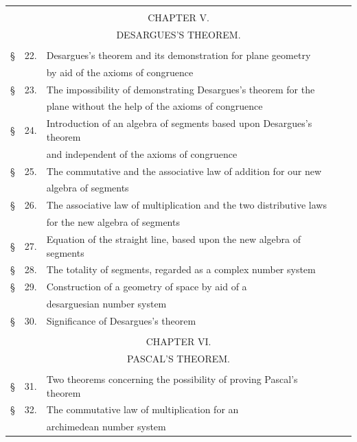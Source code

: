 \documentclass[11pt,oneside]{book}
\begin{document}
\begin{tabular}{l@{}rl@{\ }r}
\multicolumn{4}{c}{}\\
\multicolumn{4}{c}{CHAPTER V.}\\
\multicolumn{4}{c}{\small DESARGUES'S THEOREM.}\\
\multicolumn{4}{c}{}\\
\S &22. &Desargues's theorem and its demonstration for plane geometry&\\
&& by aid of the axioms of congruence~\dotfill &\pageref{p22}\\
\S &23. &The impossibility of demonstrating Desargues's theorem for the&\\
&& plane without the help of the axioms of congruence~\dotfill &\pageref{p23}\\
\S &24. &Introduction of an algebra of segments based upon Desargues's theorem&\\
&& and independent of the axioms of congruence~\dotfill &\pageref{p24}\\
\S &25. &The commutative and the associative law of addition for our new&\\
&& algebra of segments~\dotfill &\pageref{p25}\\
\S &26. &The associative law of multiplication and the two distributive laws&\\
&& for the new algebra of segments~\dotfill &\pageref{p26}\\
\S &27. &Equation of the straight line, based upon the new algebra of segments~\dotfill &\pageref{p27}\\
\S &28. &The totality of segments, regarded as a complex number system~\dotfill &\pageref{p28}\\
\S &29. &Construction of a geometry of space by aid of a&\\
&& desarguesian number system~\dotfill &\pageref{p29}\\
\S &30. &Significance of Desargues's theorem~\dotfill &\pageref{p30}\\
\multicolumn{4}{c}{}\\
\multicolumn{4}{c}{CHAPTER VI.}\\
\multicolumn{4}{c}{\small PASCAL'S THEOREM.}\\
\multicolumn{4}{c}{}\\
\S &31. &Two theorems concerning the possibility of proving Pascal's theorem~\dotfill &\pageref{p31}\\
\S &32. &The commutative law of multiplication for an&\\
&& archimedean number system~\dotfill &\pageref{p32}\\

\end{tabular}
\end{document}
